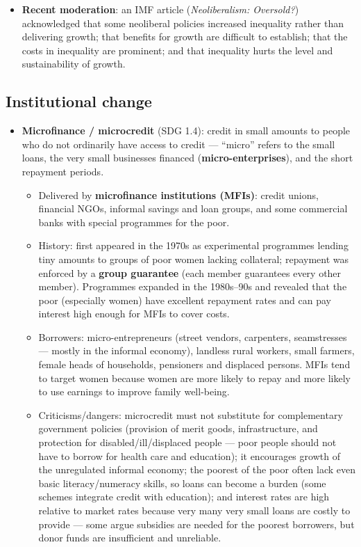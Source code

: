 \documentclass[a4paper,12pt]{article}
\newcommand{\needbold}[1]{\textcolor{red!70!black}{\textbf{#1}}}
\begin{document}
\begin{itemize}
\begin{itemize}
    \item \textbf{Recent moderation}: an IMF article (\textit{Neoliberalism: Oversold?}) acknowledged that some neoliberal policies increased inequality rather than delivering growth; that benefits for growth are difficult to establish; that the costs in inequality are prominent; and that inequality hurts the level and sustainability of growth.
  \end{itemize}
\end{itemize}

\subsection{Institutional change}
\begin{itemize}
  \item \needbold{Microfinance / microcredit} (SDG 1.4): credit in small amounts to people who do not ordinarily have access to credit --- ``micro'' refers to the small loans, the very small businesses financed (\textbf{micro-enterprises}), and the short repayment periods.
  \begin{itemize}
    \item Delivered by \textbf{microfinance institutions (MFIs)}: credit unions, financial NGOs, informal savings and loan groups, and some commercial banks with special programmes for the poor.
    \item History: first appeared in the 1970s as experimental programmes lending tiny amounts to groups of poor women lacking collateral; repayment was enforced by a \textbf{group guarantee} (each member guarantees every other member). Programmes expanded in the 1980s--90s and revealed that the poor (especially women) have excellent repayment rates and can pay interest high enough for MFIs to cover costs.
    \item Borrowers: micro-entrepreneurs (street vendors, carpenters, seamstresses --- mostly in the informal economy), landless rural workers, small farmers, female heads of households, pensioners and displaced persons. MFIs tend to target women because women are more likely to repay and more likely to use earnings to improve family well-being.
    \item Criticisms/dangers: microcredit must not substitute for complementary government policies (provision of merit goods, infrastructure, and protection for disabled/ill/displaced people --- poor people should not have to borrow for health care and education); it encourages growth of the unregulated informal economy; the poorest of the poor often lack even basic literacy/numeracy skills, so loans can become a burden (some schemes integrate credit with education); and interest rates are high relative to market rates because very many very small loans are costly to provide --- some argue subsidies are needed for the poorest borrowers, but donor funds are insufficient and unreliable.

\end{itemize}
\end{itemize}
\end{document}
